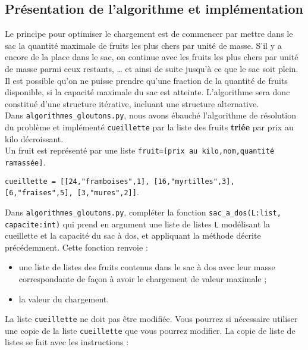 \subsection*{Présentation de l’algorithme et implémentation}
\label{sec:PrésentationDeLAlgorithmeEtImplémentation}

Le principe pour optimiser le chargement est de commencer par mettre dans le sac la quantité maximale de fruits les plus chers par unité de masse. S'il y a encore de la place dans le sac, on continue avec les fruits les plus chers par unité de masse parmi ceux restants, … et ainsi de suite jusqu'à ce que le sac soit plein.\\
Il est possible qu'on ne puisse prendre qu'une fraction de la quantité de fruits disponible, si la capacité maximale du sac est atteinte. L'algorithme sera donc constitué d'une structure itérative, incluant une structure alternative.\\

Dans \lstinline{algorithmes_gloutons.py}, nous avons ébauché l'algorithme de résolution du problème et implémenté \lstinline{cueillette} par la liste des fruits \textbf{triée} par prix au kilo décroissant.\\
Un fruit est représenté par une liste \lstinline{fruit=[prix au kilo,nom,quantité ramassée]}.

\lstinline{cueillette = [[24,"framboises",1], [16,"myrtilles",3], [6,"fraises",5], [3,"mures",2]]}.

\begin{question}
Dans \lstinline{algorithmes_gloutons.py}, compléter la fonction \lstinline{sac_a_dos(L:list, capacite:int)} qui prend en argument une liste de listes \lstinline{L} modélisant la cueillette et la capacité du sac à dos, et appliquant la méthode décrite précédemment. Cette fonction renvoie :
\begin{itemize}
\item une liste de listes des fruits contenus dans le sac à dos avec leur masse correspondante de façon à avoir le chargement de valeur maximale ;
\item la valeur du chargement.
\end{itemize}
\end{question}

La liste \lstinline{cueillette} ne doit pas être modifiée. Vous pourrez si nécessaire utiliser une copie de la liste  \lstinline{cueillette} que vous pourrez modifier. La copie de liste de listes se fait avec les instructions :

